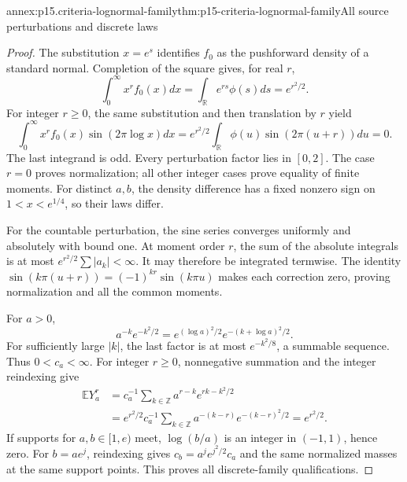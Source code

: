 \begin{annexitem}{annex:p15.criteria-lognormal-family}{thm:p15-criteria-lognormal-family}{All source perturbations and discrete laws}
\begin{proof}
The substitution \(x=e^s\) identifies \(f_0\) as
the pushforward density of a standard normal.
Completion of the square gives, for real \(r\),
\[
 \int_0^\infty x^rf_0(x)dx
        =\int_{\mathbb R}e^{rs}\phi(s)ds=e^{r^2/2}.
\]
For integer \(r\geq0\), the same substitution and
then translation by \(r\) yield
\[
 \int_0^\infty x^rf_0(x)\sin(2\pi\log x)dx
   =e^{r^2/2}\int_{\mathbb R}\phi(u)\sin(2\pi(u+r))du=0.
\]
The last integrand is odd.
Every perturbation factor lies in \([0,2]\).
The case \(r=0\) proves normalization; all other
integer cases prove equality of finite moments.
For distinct \(a,b\), the density difference has
a fixed nonzero sign on \(1<x<e^{1/4}\), so
their laws differ.

For the countable perturbation, the sine series
converges uniformly and absolutely with bound one.
At moment order \(r\), the sum of the absolute
integrals is at most \(e^{r^2/2}\sum|a_k|<\infty\).
It may therefore be integrated termwise.
The identity
\(\sin(k\pi(u+r))=(-1)^{kr}\sin(k\pi u)\)
makes each correction zero, proving normalization
and all the common moments.

For \(a>0\),
\[
 a^{-k}e^{-k^2/2}
       =e^{(\log a)^2/2}e^{-(k+\log a)^2/2}.
\]
For sufficiently large \(|k|\), the last factor
is at most \(e^{-k^2/8}\), a summable sequence.
Thus \(0<c_a<\infty\).
For integer \(r\geq0\), nonnegative summation and
the integer reindexing give
\[
 \begin{aligned}
 \mathbb EY_a^r
 &=c_a^{-1}\sum_{k\in\mathbb Z}a^{r-k}e^{rk-k^2/2}\\
 &=e^{r^2/2}c_a^{-1}\sum_{k\in\mathbb Z}
               a^{-(k-r)}e^{-(k-r)^2/2}=e^{r^2/2}.
 \end{aligned}
\]
If supports for \(a,b\in[1,e)\) meet,
\(\log(b/a)\) is an integer in \((-1,1)\), hence zero.
For \(b=ae^j\), reindexing gives
\(c_b=a^j e^{j^2/2}c_a\) and the same normalized
masses at the same support points. This proves
all discrete-family qualifications.
\end{proof}
\end{annexitem}

